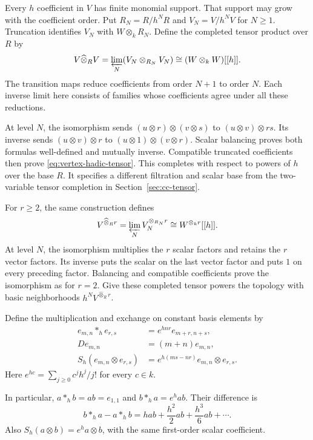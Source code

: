 Every $h$ coefficient in $V$ has finite monomial support.
That support may grow with the coefficient order.
Put $R_N=R/h^NR$ and $V_N=V/h^NV$ for $N\geq1$.
Truncation identifies $V_N$ with $W\otimes_kR_N$.
Define the completed tensor product over $R$ by
\begin{equation}\label{eq:vertex-hadic-tensor}
 V\widehat\otimes_RV
   =\varprojlim_N(V_N\otimes_{R_N}V_N)
   \cong(W\otimes_kW)[[h]].
\end{equation}
The transition maps reduce coefficients from order $N+1$ to order $N$.
Each inverse limit here consists of families whose coefficients agree
under all these reductions.

At level $N$, the isomorphism sends
$(u\otimes r)\otimes(v\otimes s)$ to $(u\otimes v)\otimes rs$.
Its inverse sends $(u\otimes v)\otimes r$ to
$(u\otimes1)\otimes(v\otimes r)$.
Scalar balancing proves both formulas well-defined and mutually inverse.
Compatible truncated coefficients then prove
\eqref{eq:vertex-hadic-tensor}.
This completes with respect to powers of $h$ over the base $R$.
It specifies a different filtration and scalar base from the
two-variable tensor completion in Section~\ref{sec:cc-tensor}.

For $r\geq2$, the same construction defines
\[
 V^{\widehat\otimes_R r}
   =\varprojlim_N V_N^{\otimes_{R_N}r}
   \cong W^{\otimes_k r}[[h]].
\]
At level $N$, the isomorphism multiplies the $r$ scalar factors
and retains the $r$ vector factors.
Its inverse puts the scalar on the last vector factor and
puts $1$ on every preceding factor.
Balancing and compatible coefficients prove the isomorphism as for $r=2$.
Give these completed tensor powers the topology with basic neighborhoods
$h^NV^{\widehat\otimes_R r}$.

Define the multiplication and exchange on constant basis elements by
\begin{equation}\label{eq:vertex-hadic-operations}
 \begin{aligned}
 e_{m,n}*_h e_{r,s}&=e^{hnr}e_{m+r,n+s},\\
 De_{m,n}&=(m+n)e_{m,n},\\
 S_h(e_{m,n}\otimes e_{r,s})
   &=e^{h(ms-nr)}e_{m,n}\otimes e_{r,s}.
 \end{aligned}
\end{equation}
Here $e^{hc}=\sum_{j\geq0}c^jh^j/j!$ for every $c\in k$.

In particular, $a*_h b=ab=e_{1,1}$ and $b*_h a=e^h ab$.
Their difference is
\[
 b*_h a-a*_h b
   =h ab+\frac{h^2}{2}ab+\frac{h^3}{6}ab+\cdots.
\]
Also $S_h(a\otimes b)=e^h a\otimes b$, with the same
first-order scalar coefficient.

